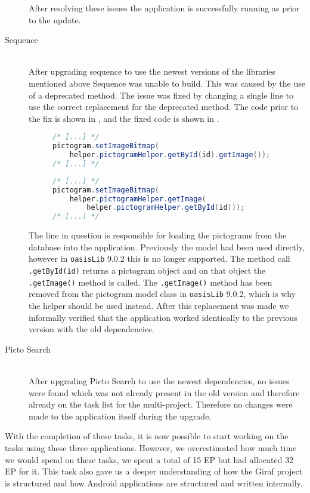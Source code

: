 \begin{description}
    After resolving these issues the application is successfully running as prior to the update. 
     \item[Sequence] \hfill \\ 
    After upgrading sequence to use the newest versions of the libraries mentioned above Sequence was unable to build. 
    This was caused by the use of a deprecated method. 
    The issue was fixed by changing a single line to use the correct replacement for the deprecated method. 
    The code prior to the fix is shown in , and the fixed code is shown in . 
    \begin{figure} 
        \begin{lstlisting}[language=java, caption={Sequence with deprecated method call. }, label=lst:dep-seq-prev] 
/* [...] */ 
pictogram.setImageBitmap( 
    helper.pictogramHelper.getById(id).getImage()); 
/* [...] */ 
        \end{lstlisting} 
    \end{figure} 
    \begin{figure} 
        \begin{lstlisting}[language=java, caption={Sequence using the replacement code. }, label=lst:dep-seq-upd] 
/* [...] */ 
pictogram.setImageBitmap( 
    helper.pictogramHelper.getImage( 
        helper.pictogramHelper.getById(id))); 
/* [...] */ 
        \end{lstlisting} 
    \end{figure} 
    The line in question is responsible for loading the pictograms from the database into the application. 
    Previously the model had been used directly, however in \texttt{oasisLib} 9.0.2 this is no longer supported. 
    The method call \texttt{.getById(id)} returns a pictogram object and on that object the \texttt{.getImage()} method is called. 
    The \texttt{.getImage()} method has been removed from the pictogram model class in \texttt{oasisLib} 9.0.2, which is why the helper should be used instead. 
    After this replacement was made we informally verified that the application worked identically to the previous version with the old dependencies. 
    \item[Picto Search] \hfill \\
    After upgrading Picto Search to use the newest dependencies, no issues were found which was not already present in the old version and therefore already on the task list for the multi-project. 
    Therefore no changes were made to the application itself during the upgrade. 
 \end{description}
 
 With the completion of these tasks, it is now possible to start working on the tasks using these three applications. 
 However, we overestimated how much time we would spend on these tasks, we spent a total of 15 EP but had allocated 32 EP for it. 
 This task also gave us a deeper understanding of how the Giraf project is structured and how Android applications are structured and written internally. 
